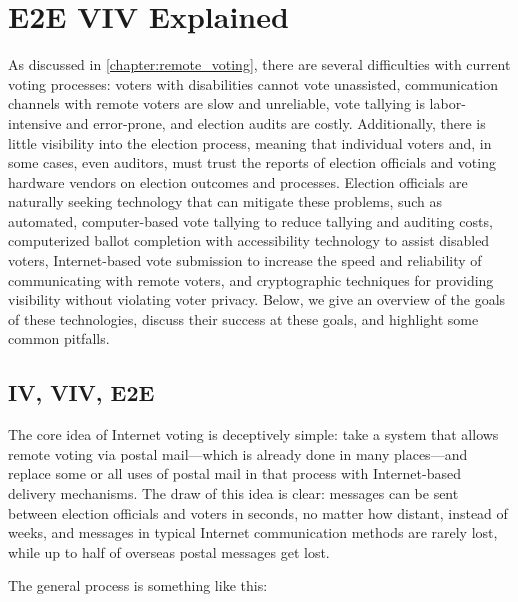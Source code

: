 \chapter{E2E VIV Explained}
\label{chapter:e2e_viv_explained}

As discussed in \autoref{chapter:remote_voting}, there are several
difficulties with current voting processes: voters with disabilities cannot
vote unassisted, communication channels with remote voters are slow and
unreliable, vote tallying is labor-intensive and error-prone, and
election audits are costly. Additionally, there is little visibility into
the election process, meaning that individual voters and, in some cases,
even auditors, must trust the reports of election officials and voting
hardware vendors on election outcomes and processes. Election officials are
naturally seeking technology that can mitigate these problems, such as
automated, computer-based vote tallying to reduce tallying and auditing
costs, computerized ballot completion with accessibility technology to
assist disabled voters, Internet-based vote submission to increase the speed
and reliability of communicating with remote voters, and cryptographic
techniques for providing visibility without violating voter privacy. Below,
we give an overview of the goals of these technologies, discuss their
success at these goals, and highlight some common pitfalls.

\section{IV, VIV, E2E}

The core idea of Internet voting is deceptively simple: take a system that
allows remote voting via postal mail---which is already done in many
places---and replace some or all uses of postal mail in that process with
Internet-based delivery mechanisms. The draw of this idea is clear: messages
can be sent between election officials and voters in seconds, no matter how
distant, instead of weeks, and messages in typical Internet communication
methods are rarely lost, while up to half of overseas postal messages get
lost.

The general process is something like this:


